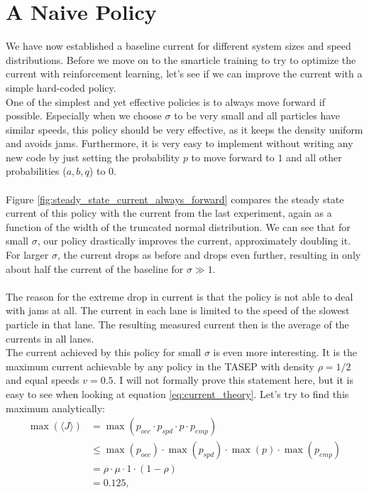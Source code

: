 \section{A Naive Policy}
We have now established a baseline current for different system sizes and speed distributions. Before we move on to the smarticle training to try to optimize the current with reinforcement learning, let's see if we can improve the current with a simple hard-coded policy. 
\\
One of the simplest and yet effective policies is to always move forward if possible. Especially when we choose $\sigma$ to be very small and all particles have similar speeds, this policy should be very effective, as it keeps the density uniform and avoids jams. Furthermore, it is very easy to implement without writing any new code by just setting the probability $p$ to move forward to $1$ and all other probabilities ($a,b,q$) to $0$.
\\
\\
Figure \ref{fig:steady_state_current_always_forward} compares the steady state current of this policy with the current from the last experiment, again as a function of the width of the truncated normal distribution. We can see that for small $\sigma$, our policy drastically improves the current, approximately doubling it. For larger $\sigma$, the current drops as before and drops even further, resulting in only about half the current of the baseline for $\sigma\gg 1$. 
\\
\\
The reason for the extreme drop in current is that the policy is not able to deal with jams at all. The current in each lane is limited to the speed of the slowest particle in that lane. The resulting measured current then is the average of the currents in all lanes. 
\\
The current achieved by this policy for small $\sigma$ is even more interesting. It is the maximum current achievable by any policy in the TASEP with density $\rho=1/2$ and equal speeds $v=0.5$. I will not formally prove this statement here, but it is easy to see when looking at equation \ref{eq:current_theory}. Let's try to find this maximum analytically:
\begin{align*}
    \max(\langle J\rangle) &= \max(p_{occ} \cdot p_{spd} \cdot p \cdot p_{emp}) \\
                           &\le \max(p_{occ}) \cdot \max(p_{spd}) \cdot \max(p) \cdot \max(p_{emp}) \\
                           &= \rho \cdot \mu \cdot 1 \cdot (1-\rho) \\
                            &= 0.125 \text{,}
\end{align*}
